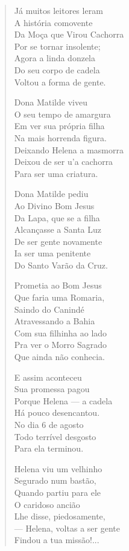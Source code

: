 \begin{verse}
Já muitos leitores leram \\
A história comovente \\
Da Moça que Virou Cachorra \\
Por se tornar insolente; \\
Agora a linda donzela \\
Do seu corpo de cadela \\
Voltou a forma de gente. 

Dona Matilde viveu \\
O seu tempo de amargura \\
Em ver sua própria filha \\
Na mais horrenda figura. \\
Deixando Helena a masmorra \\
Deixou de ser u'a cachorra \\
Para ser uma criatura. 

Dona Matilde pediu \\
Ao Divino Bom Jesus \\
Da Lapa, que se a filha \\
Alcançasse a Santa Luz \\
De ser gente novamente \\
Ia ser uma penitente \\
Do Santo Varão da Cruz. 


Prometia ao Bom Jesus \\
Que faria uma Romaria, \\
Saindo do Canindé \\
Atravessando a Bahia \\
Com sua filhinha ao lado \\
Pra ver o Morro Sagrado \\
Que ainda não conhecia. 

E assim aconteceu \\
Sua promessa pagou\\
Porque Helena --- a cadela \\
Há pouco desencantou. \\
No dia 6 de agosto \\
Todo terrível desgosto \\
Para ela terminou. 

Helena viu um velhinho \\
Segurado num bastão, \\
Quando partiu para ele \\
O caridoso ancião \\
Lhe disse, piedosamente, \\
--- Helena, voltas a ser gente \\
Findou a tua missão!...


\end{verse}
